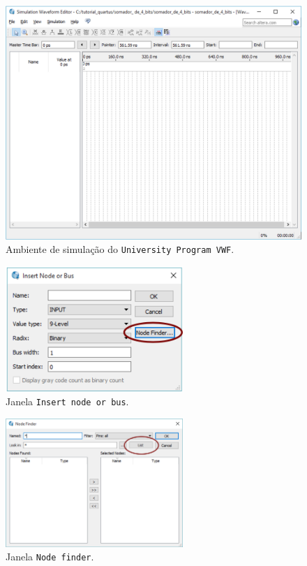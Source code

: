\documentclass[12pt,a4paper]{article}
\begin{document}
\begin{figure}[htbp!]
    \centering
    \includegraphics[width=\textwidth]{./figs/fig24.png}
    \caption{Ambiente de simulação do \texttt{University Program VWF}.}
    \label{fig:24}
\end{figure}

\begin{figure}[htbp!]
    \centering
    \includegraphics[width=0.6\textwidth]{./figs/fig25.png}
    \caption{Janela \texttt{Insert node or bus}.}
    \label{fig:25}
\end{figure}

\begin{figure}[htbp!]
    \centering
    \includegraphics[width=0.6\textwidth]{./figs/fig26.png}
    \caption{Janela \texttt{Node finder}.}
    \label{fig:26}
\end{figure}
\end{document}
